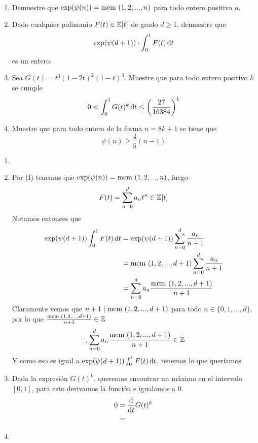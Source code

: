 \begin{prob}[2 pts. c/u]
	\
	\begin{enumerate}[label = (\roman*)]
		\item Demuestre que $\exp(\psi(n))=\text{mcm }(1,2,...,n)$ para todo entero positivo $n$.

		\item Dado cualquier polinomio $F(t)\in\mathbb{Z}[t]$ de grado $d\geq 1$, demuestre que
		      \[\exp(\psi(d+1))\cdot\int^1_0F(t)\operatorname{d}\!{t}\]
		      es un entero.

		\item Sea $G(t)=t^3(1-2t)^2(1-t)^3$. Muestre que para todo entero positivo $k$ se cumple
		      \[0<\int^1_0G(t)^k\operatorname{d}\!{t}\leq\left(\frac{27}{16384}\right)^k\]

		\item Muestre que para todo entero de la forma $n=8k+1$ se tiene que
		      \[\psi(n)\geq\frac{4}{5}(n-1)\]
	\end{enumerate}
\end{prob}

\begin{sol}
	\begin{enumerate}[label = (\roman*)]
		\item

		\item Por (I) tenemos que $\exp(\psi(n))=\text{mcm }(1,2,...,n)$, luego
		      \[F(t)=\sum_{n=0}^da_nt^n\in\mathbb{Z}[t]\]
		      Notamos entonces que
		      \begin{align*}
			      \exp(\psi(d+1))\int_0^1 F(t)\operatorname{d}\!{t} & =\exp(\psi(d+1))\sum_{n=0}^d\frac{a_n}{n+1}   \\
			                                        & =\text{mcm }(1,2,...,d+1)\sum_{n=0}^d\frac{a_n}{n+1} \\
			                                        & =\sum_{n=0}^da_n\frac{\text{mcm }(1,2,...,d+1)}{n+1}
		      \end{align*}
		      Claramente vemos que $n+1\mid\text{mcm }(1,2,...,d+1)$ para todo $n\in\{0,1,...,d\}$, por lo que $\frac{\text{mcm }(1,2,...,d+1)}{n+1}\in\mathbb{Z}$
		      \[\therefore \sum_{n=0}^da_n\frac{\text{mcm }(1,2,...,d+1)}{n+1}\in\mathbb{Z}\]
		      Y como eso es igual a $\exp(\psi(d+1))\int_0^1F(t)\operatorname{d}\!{t}$, tenemos lo que queríamos.

		\item Dada la expresión $G(t)^k$, queremos encontrar un máximo en el intervalo $[0,1]$, para esto derivamos la función e igualamos a 0.
		      \begin{align*}
			      0 & =\frac{\operatorname{d}\!{}}{\operatorname{d}\!{t}}G(t)^k \\
			        & =
		      \end{align*}

		\item
	\end{enumerate}
\end{sol}

